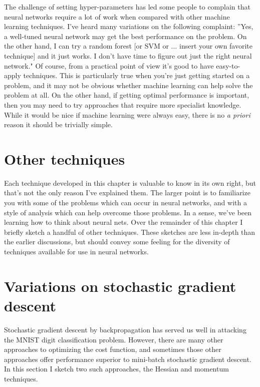 The challenge of setting hyper-parameters has led some people to complain that neural networks require a lot of work when compared with other machine learning techniques. I've heard many variations on the following complaint: ''Yes, a well-tuned neural network may get the best performance on the problem. On the other hand, I can try a random forest [or SVM or $\ldots$
insert your own favorite technique] and it just works. I don't have time to figure out just the right neural network." Of course, from a practical point of view it's good to have easy-to-apply techniques. This is particularly true when you're just getting started on a problem, and it may not be obvious whether machine learning can help solve the problem at all. On the other hand, if getting optimal performance is important, then you may need to try approaches that require more specialist knowledge. While it would be nice if machine learning were always easy, there is no \textit{a priori} reason it should be trivially simple.




\section{Other techniques}


Each technique developed in this chapter is valuable to know in its own right, but that's not the only reason I've explained them. The larger point is to familiarize you with some of the problems which can occur in neural networks, and with a style of analysis which can help overcome those problems. In a sense, we've been learning how to think about neural nets. Over the remainder of this chapter I briefly sketch a handful of other techniques. These sketches are less in-depth than the earlier discussions, but should convey some feeling for the diversity of techniques available for use in neural networks.

\section{Variations on stochastic gradient descent}

Stochastic gradient descent by backpropagation has served us well in attacking the MNIST digit classification problem. However, there are many other approaches to optimizing the cost function, and sometimes those other approaches offer performance superior to mini-batch stochastic gradient descent. In this section I sketch two such approaches, the Hessian and momentum techniques.


